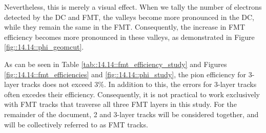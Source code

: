     Nevertheless, this is merely a visual effect.
    When we tally the number of electrons detected by the DC and FMT, the valleys become more pronounced in the DC, while they remain the same in the FMT.
    Consequently, the increase in FMT efficiency becomes more pronounced in these valleys, as demonstrated in Figure \ref{fig::14.14::phi_geomcut}.

    As can be seen in Table \ref{tab::14.14::fmt_efficiency_study} and Figures \ref{fig::14.14::fmt_efficiencies} and \ref{fig::14.14::phi_study}, the pion efficiency for 3-layer tracks does not exceed $3\%$.
    In addition to this, the errors for 3-layer tracks often excedes their efficiency.
    Consequently, it is not practical to work exclusively with FMT tracks that traverse all three FMT layers in this study.
    For the remainder of the document, 2 and 3-layer tracks will be considered together, and will be collectively referred to as FMT tracks.
